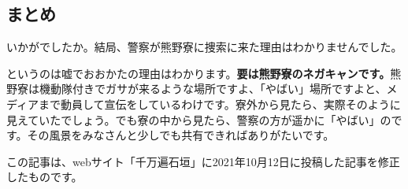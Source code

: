 \subsection{まとめ}

いかがでしたか。結局、警察が熊野寮に捜索に来た理由はわかりませんでした。

というのは嘘でおおかたの理由はわかります。\textbf{要は熊野寮のネガキャンです。}熊野寮は機動隊付きでガサが来るような場所ですよ、「やばい」場所ですよと、メディアまで動員して宣伝をしているわけです。寮外から見たら、実際そのように見えていたでしょう。でも寮の中から見たら、警察の方が遥かに「やばい」のです。その風景をみなさんと少しでも共有できればありがたいです。


{\scriptsize この記事は、webサイト「千万遍石垣」に2021年10月12日に投稿した記事を修正したものです。}

